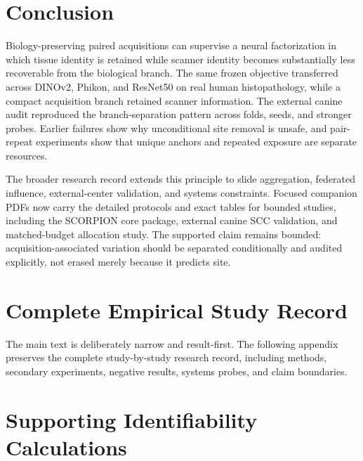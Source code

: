\documentclass[10pt]{article}
\begin{document}
\section{Conclusion}
Biology-preserving paired acquisitions can supervise a neural factorization in which tissue identity is retained while scanner identity becomes substantially less recoverable from the biological branch. The same frozen objective transferred across DINOv2, Phikon, and ResNet50 on real human histopathology, while a compact acquisition branch retained scanner information. The external canine audit reproduced the branch-separation pattern across folds, seeds, and stronger probes. Earlier failures show why unconditional site removal is unsafe, and pair-repeat experiments show that unique anchors and repeated exposure are separate resources.

The broader research record extends this principle to slide aggregation, federated influence, external-center validation, and systems constraints. Focused companion PDFs now carry the detailed protocols and exact tables for bounded studies, including the SCORPION core package, external canine SCC validation, and matched-budget allocation study. The supported claim remains bounded: acquisition-associated variation should be separated conditionally and audited explicitly, not erased merely because it predicts site.

\appendix
\section{Complete Empirical Study Record}
The main text is deliberately narrow and result-first. The following appendix preserves the complete study-by-study research record, including methods, secondary experiments, negative results, systems probes, and claim boundaries.



\section{Supporting Identifiability Calculations}




\end{document}
